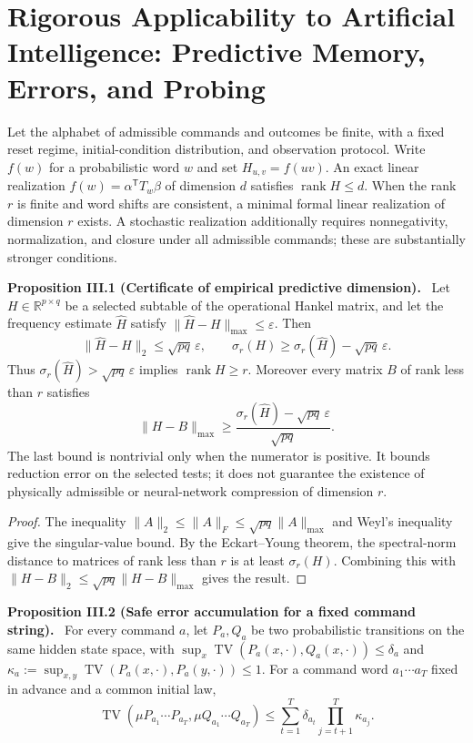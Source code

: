 \documentclass[11pt,a4paper,oneside]{book}
\newcommand{\R}{\mathbb R}\newcommand{\C}{\mathbb C}\newcommand{\Z}{\mathbb Z}\newcommand{\N}{\mathbb N}\newcommand{\Q}{\mathbb Q}
\DeclareMathOperator{\rank}{rank}\DeclareMathOperator{\Tr}{Tr}
\newcommand{\statement}[3]{\par\medskip\noindent\textbf{#1 #2 (#3).}\ }
\begin{document}
\chapter{Rigorous Applicability to Artificial Intelligence: Predictive Memory, Errors, and Probing}
Let the alphabet of admissible commands and outcomes be finite, with a fixed reset regime, initial-condition distribution, and observation protocol. Write $f(w)$ for a probabilistic word $w$ and set $H_{u,v}=f(uv)$. An exact linear realization $f(w)=\alpha^{\mathsf T}T_w\beta$ of dimension $d$ satisfies $\rank H\le d$. When the rank $r$ is finite and word shifts are consistent, a minimal formal linear realization of dimension $r$ exists. A stochastic realization additionally requires nonnegativity, normalization, and closure under all admissible commands; these are substantially stronger conditions.
\statement{Proposition}{III.1}{Certificate of empirical predictive dimension} Let $H\in\R^{p\times q}$ be a selected subtable of the operational Hankel matrix, and let the frequency estimate $\widehat H$ satisfy $\|\widehat H-H\|_{\max}\le\varepsilon$. Then
\[\|\widehat H-H\|_2\le\sqrt{pq}\,\varepsilon,\qquad\sigma_r(H)\ge\sigma_r(\widehat H)-\sqrt{pq}\,\varepsilon.\]
Thus $\sigma_r(\widehat H)>\sqrt{pq}\,\varepsilon$ implies $\rank H\ge r$. Moreover every matrix $B$ of rank less than $r$ satisfies
\[\|H-B\|_{\max}\ge\frac{\sigma_r(\widehat H)-\sqrt{pq}\,\varepsilon}{\sqrt{pq}}.\]
The last bound is nontrivial only when the numerator is positive. It bounds reduction error on the selected tests; it does not guarantee the existence of physically admissible or neural-network compression of dimension $r$.
\begin{proof}The inequality $\|A\|_2\le\|A\|_F\le\sqrt{pq}\|A\|_{\max}$ and Weyl's inequality give the singular-value bound. By the Eckart--Young theorem, the spectral-norm distance to matrices of rank less than $r$ is at least $\sigma_r(H)$. Combining this with $\|H-B\|_2\le\sqrt{pq}\|H-B\|_{\max}$ gives the result.\end{proof}
\statement{Proposition}{III.2}{Safe error accumulation for a fixed command string} For every command $a$, let $P_a,Q_a$ be two probabilistic transitions on the same hidden state space, with $\sup_x\operatorname{TV}(P_a(x,\cdot),Q_a(x,\cdot))\le\delta_a$ and $\kappa_a:=\sup_{x,y}\operatorname{TV}(P_a(x,\cdot),P_a(y,\cdot))\le1$. For a command word $a_1\cdots a_T$ fixed in advance and a common initial law,
\[\operatorname{TV}(\mu P_{a_1}\cdots P_{a_T},\mu Q_{a_1}\cdots Q_{a_T})\le\sum_{t=1}^T\delta_{a_t}\prod_{j=t+1}^T\kappa_{a_j}.\]
\end{document}
